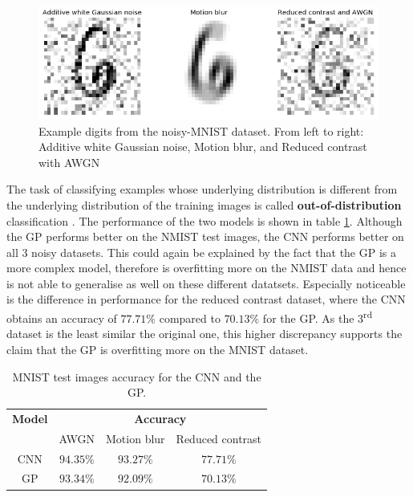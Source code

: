 \documentclass{article}
\begin{document}
\begin{figure}
	\centering
	\includegraphics[scale=0.2]{noisy_mnist_example}
	\caption{Example digits from the noisy-MNIST dataset. From left to right: Additive white Gaussian noise, Motion blur, and Reduced contrast with AWGN}
	\label{fig/noisy_mnist_example}
\end{figure}

The task of classifying examples whose underlying distribution is different from the underlying distribution of the training images is called \textbf{out-of-distribution} classification \cite{Gal2016Uncertainty}. The performance of the two models is shown in table \ref{table/noisy_mnist_acc}. Although the GP performs better on the NMIST test images, the CNN performs better on all 3 noisy datasets. This could again be explained by the fact that the GP is a more complex model, therefore is overfitting more on the NMIST data and hence is not able to generalise as well on these different datatsets. Especially noticeable is the difference in performance for the reduced contrast dataset, where the CNN obtains an accuracy of $77.71\%$ compared to $70.13\%$ for the GP. As the 3\textsuperscript{rd} dataset is the least similar the original one, this higher discrepancy supports the claim that the GP is overfitting more on the MNIST dataset.

\begin{table}[h]
\centering	
{\renewcommand{\arraystretch}{1.4} %
\begin{tabular}{ c | c c c}
\textbf{Model} & \multicolumn{3}{c}{\textbf{Accuracy}}\\
& AWGN & Motion blur & Reduced contrast\\
\hline
CNN & $94.35\%$ & $93.27\%$ & $77.71\%$ \\
GP & $93.34\%$  & $92.09\%$ & $70.13\%$ \\
\end{tabular}
}
\caption{MNIST test images accuracy for the CNN and the GP.}
\label{table/noisy_mnist_acc}
\end{table}
\end{document}
